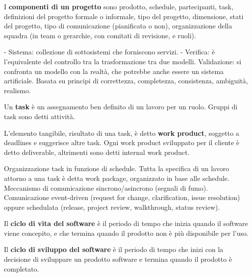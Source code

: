 \documentclass{article}
\begin{document}
    \vspace{3mm}
    
    I \textbf{componenti di un progetto} sono prodotto, schedule, partecipanti, task, definizioni del progetto formale o informale, tipo del progetto, dimensione, stati del progetto, tipo di comunicazione (pianificata o non), organizzazione della squadra (in team o gerarchie, con comitati di revisione, e ruoli).
    
            
        
        -	Sistema: collezione di sottosistemi che forniscono servizi.
        -	Verifica: è l’equivalente del controllo tra la trasformazione tra due modelli. Validazione: si confronta un modello con la realtà, che potrebbe anche essere un sistema artificiale. Basata su principi di correttezza, completezza, consistenza, ambiguità, realismo.
    
    \vspace{3mm}
    
    Un \textbf{task} è un assegnamento ben definito di un lavoro per un ruolo. Gruppi di task sono detti attività. 
    
    \vspace{3mm}
    
    L’elemento tangibile, risultato di una task, è detto \textbf{work product}, soggetto a deadlines e suggerisce altre task. Ogni work product sviluppato per il cliente è detto deliverable, altrimenti sono detti internal work product. 
    
    Organizzazione task in funzione di schedule. Tutta la specifica di un lavoro attorno a una task è detta work package, organizzato in base alle schedule. Meccanismo di comunicazione sincrono/asincrono (segnali di fumo). Comunicazione event-driven (request for change, clarification, issue resolution) oppure schedulata (release, project review, walkthrough, status review).
    
    \vspace{3mm}
    
    Il \textbf{ciclo di vita del software} è il periodo di tempo che inizia quando il software viene concepito, e che termina quando il prodotto non è più disponibile per l’uso. 
    
    \vspace{3mm}
    
    Il \textbf{ciclo di sviluppo del software} è il periodo di tempo che inizi con la decisione di sviluppare un prodotto software e termina quando il prodotto è completato.
\end{document}
